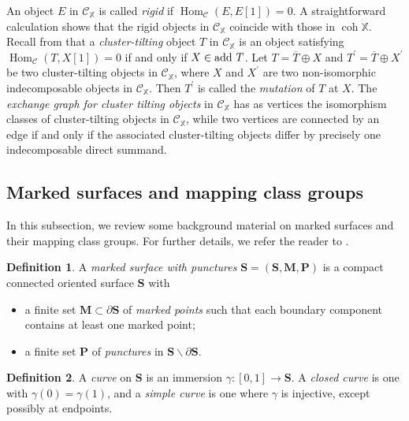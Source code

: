 \documentclass[11pt,a4paper,reqno]{amsart}%
\theoremstyle{plain}
\theoremstyle{definition}
\newtheorem{definition}[definition]{Definition}
\numberwithin{equation}{section}
\numberwithin{equation}{section}
\def\XX{\mathbb{X}}
\newcommand{\cC}{\mathcal{C}}
\newcommand{\Hom}{\operatorname{Hom}\nolimits}
\def\surf{\mathbf{S}} %
\def\coh{\operatorname{coh}}
\def\Hom{\operatorname{Hom}}
\def\surf{\mathbf{S}}                       %
\def\M{\mathbf{M}}
\def\coh{\operatorname{coh}}
\renewcommand\P{\mathbf{P}} %
\begin{document}
An object $E$ in $\cC_\XX$ is called \emph{rigid} if $\Hom_\cC(E,E[1])=0$. 
 A straightforward calculation shows that 
the rigid objects in $\cC_\XX$ coincide with those in  $\coh\XX$.
Recall from \cite{BMRRT} that a \emph{cluster-tilting} object $T$ in $\cC_\XX$  is an object satisfying $\Hom_\cC(T,X[1])=0$ if and only if $X\in {\rm add }\ T$.
Let $T=\overline{T}\oplus X$ and $T^{\prime}=\overline{T}\oplus X^{\prime}$ be two cluster-tilting objects in $\cC_\XX$, where $X$ and $X^{\prime}$ are two non-isomorphic indecomposable objects in $\cC_\XX$. Then $T^{\prime}$ is called the \emph{mutation} of $T$ at $X$.
 The \emph{exchange
graph for cluster tilting objects} in $\cC_\XX$ has as vertices the isomorphism classes of  cluster-tilting objects in $\cC_\XX$, while two vertices are connected by an edge if and only if the associated cluster-tilting objects differ by precisely one indecomposable direct summand. 
 


\subsection{Marked surfaces and mapping class groups}
In this subsection, we review some background material on marked surfaces and their mapping class groups. For further details, we refer the reader to \cite{FST,DL,FM}.
\begin{definition} 
    A \emph{marked surface with punctures} $\surf= (\surf,\M,\P) $ is   a compact connected oriented  surface $ \surf $ with 
    \begin{itemize}
        \item   a finite set $ \M \subset \partial \surf$ of   \emph{marked points} such that  each boundary component contains at least one marked point;
        \item   a finite set $ \P  $ of  \emph{punctures} in  $\surf \backslash \partial \surf$.
    \end{itemize}
\end{definition} 

 
\begin{definition}  A \emph{curve} on $\surf$ is an immersion $\gamma :[0,1]\to \surf$.  A \emph{closed curve} is one with  $\gamma(0)=\gamma(1)$, and a  \emph{simple curve} is one where $\gamma$  is injective, except possibly at endpoints.  
\end{definition}
\end{document}
